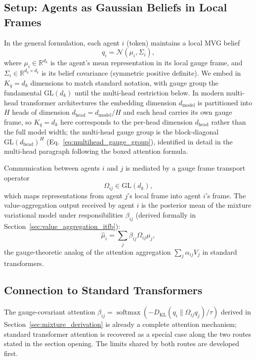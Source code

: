 \documentclass[11pt]{article}
\begin{document}
\subsection{Setup: Agents as Gaussian Beliefs in Local Frames}

In the general formulation, each agent $i$ (token) maintains a local MVG belief
\begin{equation}
q_i = \mathcal{N}(\mu_i, \Sigma_i),
\end{equation}
where $\mu_i \in \mathbb{R}^{d_k}$ is the agent's mean representation in its local gauge frame, and $\Sigma_i \in \mathbb{R}^{d_k\times d_k}$ is its belief covariance (symmetric positive definite). We embed in $K_q = d_k$ dimensions to match standard notation, with gauge group the fundamental $\mathrm{GL}(d_k)$ until the multi-head restriction below. In modern multi-head transformer architectures the embedding dimension $d_{\text{model}}$ is partitioned into $H$ heads of dimension $d_{\text{head}} = d_{\text{model}}/H$ and each head carries its own gauge frame, so $K_q=d_k$ here corresponds to the per-head dimension $d_{\text{head}}$ rather than the full model width; the multi-head gauge group is the block-diagonal $\mathrm{GL}(d_{\text{head}})^H$ (Eq.~\eqref{eq:multihead_gauge_group}), identified in detail in the multi-head paragraph following the boxed attention formula.

Communication between agents $i$ and $j$ is mediated by a gauge frame transport operator
\begin{equation}
\Omega_{ij} \in \mathrm{GL}(d_k),
\end{equation}
which maps representations from agent $j$'s local frame into agent $i$'s frame. The value-aggregation output received by agent $i$ is the posterior mean of the mixture variational model under responsibilities $\beta_{ij}$ (derived formally in Section~\ref{sec:value_aggregation_itfb}):
\begin{equation}
\hat\mu_i = \sum_j \beta_{ij} \Omega_{ij}\mu_j,
\end{equation}
the gauge-theoretic analog of the attention aggregation $\sum_j \alpha_{ij} V_j$ in standard transformers.

\subsection{Connection to Standard Transformers}

The gauge-covariant attention $\beta_{ij} = \operatorname{softmax}(-D_{\mathrm{KL}}(q_i \| \Omega_{ij} q_j)/\tau)$ derived in Section~\ref{sec:mixture_derivation} is already a complete attention mechanism; standard transformer attention is recovered as a special case along the two routes stated in the section opening. The limits shared by both routes are developed first.
\end{document}
